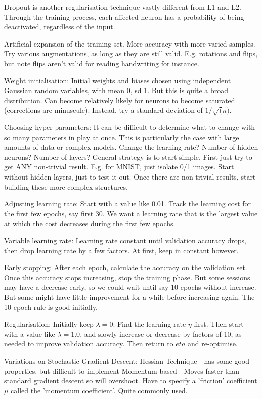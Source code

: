 \documentclass[honours,12pt]{unswthesis}
\numberwithin{equation}{section}
\begin{document}
Dropout is another regularisation technique vastly different from L1 and L2. Through the training process, each affected neuron has a probability of being deactivated, regardless of the input.

Artificial expansion of the training set. More accuracy with more varied samples. Try various augmentations, as long as they are still valid. E.g. rotations and flips, but note flips aren't valid for reading handwriting for instance.

Weight initialisation: Initial weights and biases chosen using independent Gaussian random variables, with mean 0, sd 1. But this is quite a broad distribution. Can become relatively likely for neurons to become saturated (corrections are minuscule). Instead, try a standard deviation of $1/\sqrt(n)$.

Choosing hyper-parameters:
It can be difficult to determine what to change with so many parameters in play at once. This is particularly the case with large amounts of data or complex models. Change the learning rate? Number of hidden neurons? Number of layers? 
General strategy is to start simple. First just try to get ANY non-trivial result. E.g. for MNIST, just isolate 0/1 images. Start without hidden layers, just to test it out. Once there are non-trivial results, start building these more complex structures.

Adjusting learning rate:
Start with a value like 0.01. Track the learning cost for the first few epochs, say first 30. We want a learning rate that is the largest value at which the cost decreases during the first few epochs.

Variable learning rate:
Learning rate constant until validation accuracy drops, then drop learning rate by a few factors. At first, keep in constant however.

Early stopping:
After each epoch, calculate the accuracy on the validation set. Once this accuracy stops increasing, stop the training phase. But some sessions may have a decrease early, so we could wait until say 10 epochs without increase. But some might have little improvement for a while before increasing again. The 10 epoch rule is good initially.

Regularisation:
Initially keep $\lambda = 0$. Find the learning rate $\eta$ first. Then start with a value like $\lambda = 1.0$, and slowly increase or decrease by factors of 10, as needed to improve validation accuracy. Then return to $eta$ and re-optimise.

Variations on Stochastic Gradient Descent:
Hessian Technique - has some good properties, but difficult to implement
Momentum-based - Moves faster than standard gradient descent so will overshoot. Have to specify a 'friction' coefficient $\mu$ called the 'momentum coefficient'. Quite commonly used.
\end{document}
